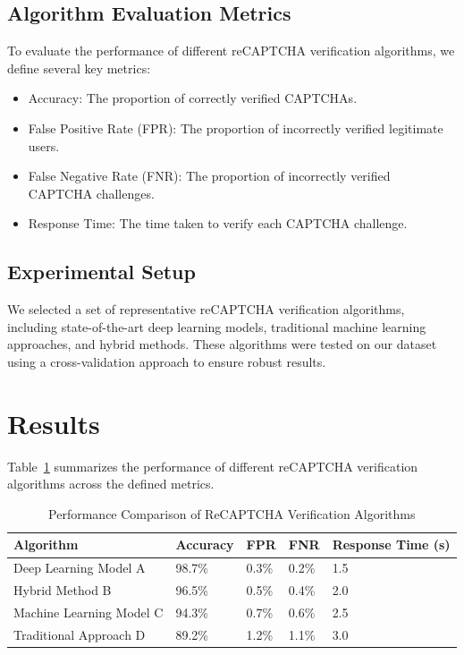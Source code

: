 \documentclass{article}
\begin{document}
\subsection{Algorithm Evaluation Metrics}
To evaluate the performance of different reCAPTCHA verification algorithms, we define several key metrics:
\begin{itemize}
    \item Accuracy: The proportion of correctly verified CAPTCHAs.
    \item False Positive Rate (FPR): The proportion of incorrectly verified legitimate users.
    \item False Negative Rate (FNR): The proportion of incorrectly verified CAPTCHA challenges.
    \item Response Time: The time taken to verify each CAPTCHA challenge.
\end{itemize}

\subsection{Experimental Setup}
We selected a set of representative reCAPTCHA verification algorithms, including state-of-the-art deep learning models, traditional machine learning approaches, and hybrid methods. These algorithms were tested on our dataset using a cross-validation approach to ensure robust results.

\section{Results}
Table~\ref{tab:results} summarizes the performance of different reCAPTCHA verification algorithms across the defined metrics.

\begin{table}[htbp]
    \centering
    \caption{Performance Comparison of ReCAPTCHA Verification Algorithms}
    \label{tab:results}
    \begin{tabular}{@{}lllll@{}}
        \toprule
        Algorithm & Accuracy & FPR & FNR & Response Time (s) \\
        \midrule
        Deep Learning Model A & 98.7\% & 0.3\% & 0.2\% & 1.5 \\
        Hybrid Method B & 96.5\% & 0.5\% & 0.4\% & 2.0 \\
        Machine Learning Model C & 94.3\% & 0.7\% & 0.6\% & 2.5 \\
        Traditional Approach D & 89.2\% & 1.2\% & 1.1\% & 3.0 \\
        \bottomrule
    \end{tabular}
\end{table}
\end{document}
